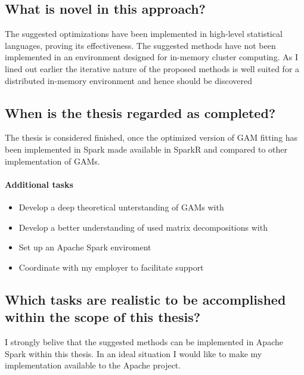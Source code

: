 \documentclass{article}
\begin{document}
    \subsection{What is novel in this approach?}
    The suggested optimizations have been implemented in high-level statistical languages, proving its effectiveness. The suggested methods have not been implemented in an environment designed for in-memory cluster computing. As I lined out earlier the iterative nature of the proposed methods is well suited for a distributed in-memory environment and hence should be discovered

    \subsection{When is the thesis regarded as completed?}
    The thesis is considered finished, once the optimized version of GAM fitting has been implemented in Spark made available in SparkR and compared to other implementation of GAMs.

    \paragraph{Additional tasks}
        \begin{itemize}
            \item Develop a deep theoretical unterstanding of GAMs with \cite{gamBook}
            \item Develop a better understanding of used matrix decompositions with \cite{strang09}
            \item Set up an Apache Spark enviroment
            \item Coordinate with my employer to facilitate support
        \end{itemize}

    \subsection{Which tasks are realistic to be accomplished within the scope of this thesis?}
    I strongly belive that the suggested methods can be implemented in Apache Spark within this thesis. In an ideal situation I would like to make my implementation available to the Apache project.
\end{document}
